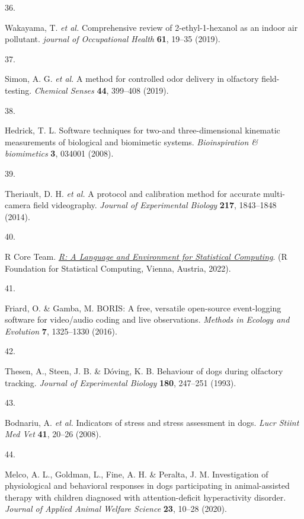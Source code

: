 \documentclass[
]{article}
\newlength{\cslhangindent}
\newlength{\csllabelwidth}
\newlength{\cslentryspacingunit} %
\newenvironment{CSLReferences}[2] %
 {%
  \setlength{\parindent}{0pt}
  \ifodd #1
  \let\oldpar\par
  \def\par{\hangindent=\cslhangindent\oldpar}
  \fi
  \setlength{\parskip}{#2\cslentryspacingunit}
 }%
 {}
\newcommand{\CSLLeftMargin}[1]{\parbox[t]{\csllabelwidth}{#1}}
\newcommand{\CSLRightInline}[1]{\parbox[t]{\linewidth - \csllabelwidth}{#1}\break}
\begin{document}
\begin{CSLReferences}{0}{0}
\leavevmode{}%
\CSLLeftMargin{36. }%
\CSLRightInline{Wakayama, T. \emph{et al.} Comprehensive review of 2-ethyl-1-hexanol as an indoor air pollutant. \emph{journal of Occupational Health} \textbf{61}, 19--35 (2019).}

\leavevmode{}%
\CSLLeftMargin{37. }%
\CSLRightInline{Simon, A. G. \emph{et al.} A method for controlled odor delivery in olfactory field-testing. \emph{Chemical Senses} \textbf{44}, 399--408 (2019).}

\leavevmode{}%
\CSLLeftMargin{38. }%
\CSLRightInline{Hedrick, T. L. Software techniques for two-and three-dimensional kinematic measurements of biological and biomimetic systems. \emph{Bioinspiration \& biomimetics} \textbf{3}, 034001 (2008).}

\leavevmode{}%
\CSLLeftMargin{39. }%
\CSLRightInline{Theriault, D. H. \emph{et al.} A protocol and calibration method for accurate multi-camera field videography. \emph{Journal of Experimental Biology} \textbf{217}, 1843--1848 (2014).}

\leavevmode{}%
\CSLLeftMargin{40. }%
\CSLRightInline{R Core Team. \emph{\href{https://www.R-project.org}{R: A Language and Environment for Statistical Computing}}. (R Foundation for Statistical Computing, Vienna, Austria, 2022).}

\leavevmode{}%
\CSLLeftMargin{41. }%
\CSLRightInline{Friard, O. \& Gamba, M. {BORIS}: A free, versatile open-source event-logging software for video/audio coding and live observations. \emph{Methods in Ecology and Evolution} \textbf{7}, 1325--1330 (2016).}

\leavevmode{}%
\CSLLeftMargin{42. }%
\CSLRightInline{Thesen, A., Steen, J. B. \& Dóving, K. B. Behaviour of dogs during olfactory tracking. \emph{Journal of Experimental Biology} \textbf{180}, 247--251 (1993).}

\leavevmode{}%
\CSLLeftMargin{43. }%
\CSLRightInline{Bodnariu, A. \emph{et al.} Indicators of stress and stress assessment in dogs. \emph{Lucr Stiint Med Vet} \textbf{41}, 20--26 (2008).}

\leavevmode{}%
\CSLLeftMargin{44. }%
\CSLRightInline{Melco, A. L., Goldman, L., Fine, A. H. \& Peralta, J. M. Investigation of physiological and behavioral responses in dogs participating in animal-assisted therapy with children diagnosed with attention-deficit hyperactivity disorder. \emph{Journal of Applied Animal Welfare Science} \textbf{23}, 10--28 (2020).}


\end{CSLReferences}
\end{document}
